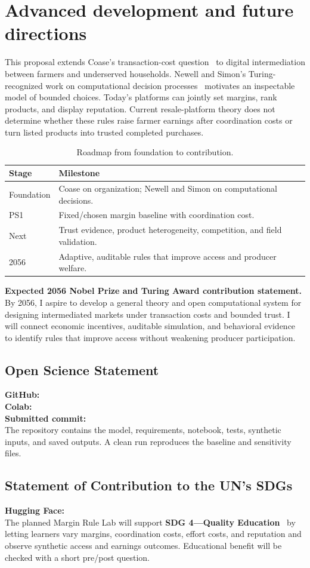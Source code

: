 \section{Advanced development and future directions}
This proposal extends Coase's transaction-cost question~\cite{coase1937,nobelcoase1991} to digital intermediation between farmers and underserved households. Newell and Simon's Turing-recognized work on computational decision processes~\cite{turing1975} motivates an inspectable model of bounded choices. Today's platforms can jointly set margins, rank products, and display reputation. Current resale-platform theory does not determine whether these rules raise farmer earnings after coordination costs or turn listed products into trusted completed purchases.
\begin{table}[h]\caption{Roadmap from foundation to contribution.}\begin{tabularx}{\columnwidth}{@{}p{1.25cm}Y@{}}\toprule\textbf{Stage}&\textbf{Milestone}\\\midrule Foundation&Coase on organization; Newell and Simon on computational decisions.\\ PS1&Fixed/chosen margin baseline with coordination cost.\\ Next&Trust evidence, product heterogeneity, competition, and field validation.\\ 2056&Adaptive, auditable rules that improve access and producer welfare.\\\bottomrule\end{tabularx}\end{table}
\noindent\textbf{Expected 2056 Nobel Prize and Turing Award contribution statement.} By 2056, I aspire to develop a general theory and open computational system for designing intermediated markets under transaction costs and bounded trust. I will connect economic incentives, auditable simulation, and behavioral evidence to identify rules that improve access without weakening producer participation.
\subsection*{Open Science Statement}\textbf{GitHub:} \GitHubLink\\\textbf{Colab:} \ColabLink\\\textbf{Submitted commit:} \SubmittedCommit\\The repository contains the model, requirements, notebook, tests, synthetic inputs, and saved outputs. A clean run reproduces the baseline and sensitivity files.
\subsection*{Statement of Contribution to the UN's SDGs}\textbf{Hugging Face:} \DemoLink\\The planned Margin Rule Lab will support \textbf{SDG 4---Quality Education}~\cite{sdg4} by letting learners vary margins, coordination costs, effort costs, and reputation and observe synthetic access and earnings outcomes. Educational benefit will be checked with a short pre/post question.
